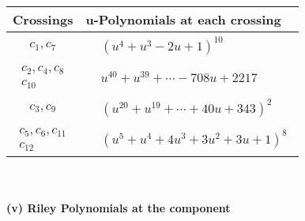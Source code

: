 \documentclass[1p]{elsarticle_modified}
\theoremstyle{definition}
\begin{document}
\begin{tabular}{m{50pt}|m{274pt}}
Crossings & \hspace{64pt}u-Polynomials at each crossing \\
\hline $$\begin{aligned}c_{1},c_{7}\end{aligned}$$&$\begin{aligned}
&(u^4+u^3-2 u+1)^{10}
\end{aligned}$\\
\hline $$\begin{aligned}c_{2},c_{4},c_{8}\\c_{10}\end{aligned}$$&$\begin{aligned}
&u^{40}+u^{39}+\cdots-708 u+2217
\end{aligned}$\\
\hline $$\begin{aligned}c_{3},c_{9}\end{aligned}$$&$\begin{aligned}
&(u^{20}+u^{19}+\cdots+40 u+343)^{2}
\end{aligned}$\\
\hline $$\begin{aligned}c_{5},c_{6},c_{11}\\c_{12}\end{aligned}$$&$\begin{aligned}
&(u^5+u^4+4 u^3+3 u^2+3 u+1)^8
\end{aligned}$\\
\hline
\end{tabular}\\~\\
\newpage\renewcommand{\arraystretch}{1}
\flushleft \textbf{(v) Riley Polynomials at the component}\newline \\
\end{document}
